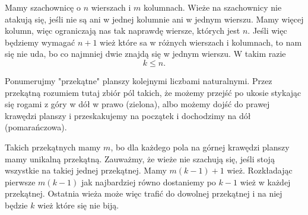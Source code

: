 \documentclass{article}[13pt]
\begin{document}
Mamy szachownicę o $n$ wierszach i $m$ kolumnach. Wieże na szachownicy nie atakują się, jeśli nie są ani w jednej kolumnie ani w jednym wierszu. Mamy więcej kolumn, więc ograniczają nas tak naprawdę wiersze, których jest $n$. Jeśli więc będziemy wymagać $n+1$ wież które sa w różnych wierszach i kolumnach, to nam się nie uda, bo co najmniej dwie znajdą się w jednym wierszu. W takim razie 
$$k\leq n.$$

Ponumerujmy "przekątne" planszy kolejnymi liczbami naturalnymi. Przez przekątną rozumiem tutaj zbiór pól takich, że możemy przejść po ukosie stykając się rogami z góry w dół w prawo (zielona), albo możemy dojść do prawej krawędzi planszy i przeskakujemy na początek i dochodzimy na dół (pomarańczowa).
\begin{center}
\end{center}

Takich przekątnych mamy $m$, bo dla każdego pola na górnej krawędzi planszy mamy unikalną przekątną. Zauważmy, że wieże nie szachują się, jeśli stoją wszystkie na takiej jednej przekątnej. Mamy $m(k-1)+1$ wież. Rozkładając pierwsze $m(k-1)$ jak najbardziej równo dostaniemy po $k-1$ wież w każdej przekątnej. Ostatnia wieża może więc trafić do dowolnej przekątnej i na niej będzie $k$ wież które się nie biją.
\end{document}
